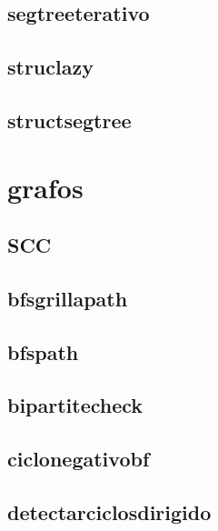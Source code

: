 \documentclass{article}
\begin{document}
\subsection{segtreeterativo}


\subsection{struclazy}


\subsection{structsegtree}


\section{grafos}
\subsection{SCC}


\subsection{bfsgrillapath}


\subsection{bfspath}


\subsection{bipartitecheck}


\subsection{ciclonegativobf}


\subsection{detectarciclosdirigido}

\end{document}
